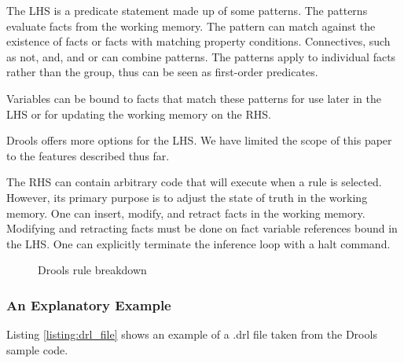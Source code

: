 The LHS is a predicate statement made up of some patterns.
The patterns evaluate facts from the working memory.
The pattern can match against the existence of facts or facts with matching property conditions.
Connectives, such as not, and, and or can combine patterns.
The patterns apply to individual facts rather than the group, thus can be seen as first-order predicates.

Variables can be bound to facts that match these patterns for use later in the LHS or for updating the working memory on the RHS.

Drools offers more options for the LHS.
We have limited the scope of this paper to the features described thus far.

The RHS can contain arbitrary code that will execute when a rule is selected.
However, its primary purpose is to adjust the state of truth in the working memory.
One can insert, modify, and retract facts in the working memory.
Modifying and retracting facts must be done on fact variable references bound in the LHS.
One can explicitly terminate the inference loop with a halt command.

\begin{figure}[h]
    \centering
    \caption{Drools rule breakdown}
    \label{fig:Drools_Rule_Breakdown}
\end{figure}

\subsubsection{An Explanatory Example}
Listing \ref{listing:drl_file} shows an example of a .drl file taken from the Drools sample code.

